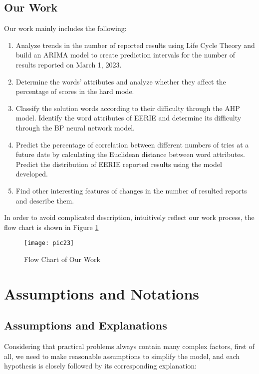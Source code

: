 \documentclass[12pt]{article}  %
\begin{document}
\subsection{Our Work}
Our work mainly includes the following:
\begin{enumerate}
	\setlength{\parsep}{0ex} %
	\setlength{\topsep}{0.5pt} %
	\setlength{\itemsep}{0.5pt} %
	\item Analyze trends in the number of reported results using Life Cycle Theory and build an ARIMA model to create prediction intervals for the number of results reported on March 1, 2023.
	
	\item Determine the words' attributes and analyze whether they affect the percentage of scores in the hard mode.
	
	\item Classify the solution words according to their difficulty through the AHP model. Identify the word attributes of EERIE and determine its difficulty through the BP neural network model.
	
	\item Predict the percentage of correlation between different numbers of tries at a future date by calculating the Euclidean distance between word attributes. Predict the distribution of EERIE reported results using the model developed.
	
	\item Find other interesting features of changes in the number of resulted reports and describe them.
\end{enumerate}

In order to avoid complicated description, intuitively reflect our work process, the flow chart is shown in Figure \ref{pic23}

\begin{figure}[htbp]  %
	\centering  %
	\texttt{[image: pic23]} %
	\caption{Flow Chart of Our Work}  
	\label{pic23}
\end{figure}
\vspace{-0.5cm}

\section{Assumptions and Notations}
\subsection{Assumptions and Explanations}
Considering that practical problems always contain many complex factors, first of all, we need to make reasonable assumptions to simplify the model, and each hypothesis is closely followed by its corresponding explanation:
\end{document}
